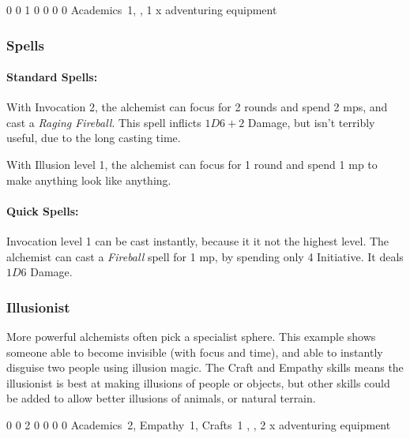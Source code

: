 {\begin{multicols}{2}

{0}%
{0}%
{{1}%
{0}%
{0}}%
{0}%
{0}%
{Academics~1,
}%
{\Dagger, 1 x adventuring equipment}%
{}

\subsubsection{Spells}

\paragraph{Standard Spells:}
With Invocation 2, the alchemist can focus for 2 rounds and spend 2 \glspl{mp}, and cast a \textit{Raging Fireball}.
This spell inflicts $1D6+2$ Damage, but isn't terribly useful, due to the long casting time.

With Illusion level 1, the alchemist can focus for 1 round and spend 1 \gls{mp} to make anything look like anything.

\paragraph{Quick Spells:}
Invocation level 1 can be cast instantly, because it it not the highest level.
The alchemist can cast a \textit{Fireball} spell for 1 \gls{mp}, by spending only 4 Initiative.
It deals $1D6$ Damage.

\subsubsection{Illusionist}

More powerful alchemists often pick a specialist sphere.
This example shows someone able to become invisible (with focus and time), and able to instantly disguise two people using illusion magic.
The Craft and Empathy skills means the illusionist is best at making illusions of people or objects, but other skills could be added to allow better illusions of animals, or natural terrain.


{0}%
{0}%
{{2}%
{0}%
{0}}%
{0}%
{0}%
{Academics~2, Empathy~1, Crafts~1
}%
{\Dagger, \completeleather, 2 x adventuring equipment}%
{}


\end{multicols}}
